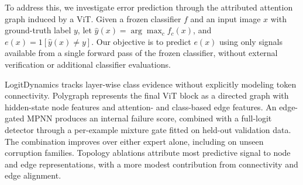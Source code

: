 \documentclass[11pt]{article}
\begin{document}
To address this, we investigate error prediction through the attributed attention graph induced by a ViT. Given a frozen classifier $f$ and an input image $x$ with ground-truth label $y$, let $
\hat{y}(x)=\arg\max_c f_c(x)$, and $
e(x)=1[\hat{y}(x)\neq y]$. Our objective is to predict $e(x)$ using only signals available from a single forward pass of the frozen classifier, without external verification or additional classifier evaluations.

LogitDynamics \citep{Beigelman2026} tracks layer-wise class evidence without explicitly modeling token connectivity. Polygraph represents the final ViT block as a directed graph with hidden-state node features and attention- and class-based edge features. An edge-gated MPNN produces an internal failure score, combined with a full-logit detector through a per-example mixture gate fitted on held-out validation data. The combination improves over either expert alone, including on unseen corruption families. Topology ablations attribute most predictive signal to node and edge representations, with a more modest contribution from connectivity and edge alignment.



\end{document}
